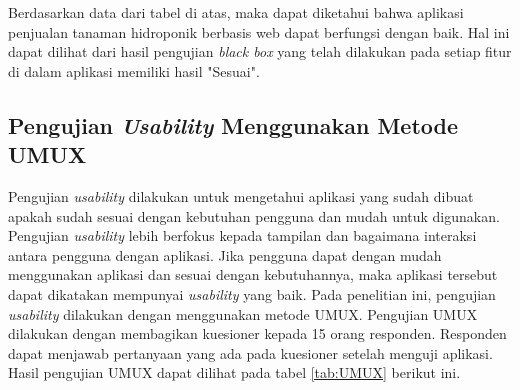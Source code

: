 
\par Berdasarkan data dari tabel di atas, maka dapat diketahui bahwa aplikasi penjualan tanaman hidroponik berbasis web dapat berfungsi dengan baik. Hal ini dapat dilihat dari hasil pengujian \textit{black box} yang telah dilakukan pada setiap fitur di dalam aplikasi memiliki hasil "Sesuai".

\subsection{Pengujian \textit{Usability} Menggunakan Metode UMUX}
Pengujian \textit{usability} dilakukan untuk mengetahui aplikasi yang sudah dibuat apakah sudah sesuai dengan kebutuhan pengguna dan mudah untuk digunakan. Pengujian \textit{usability} lebih berfokus kepada tampilan dan bagaimana interaksi antara pengguna dengan aplikasi. Jika pengguna dapat dengan mudah menggunakan aplikasi dan sesuai dengan kebutuhannya, maka aplikasi tersebut dapat dikatakan mempunyai \textit{usability} yang baik. Pada penelitian ini, pengujian \textit{usability} dilakukan dengan menggunakan metode UMUX. Pengujian UMUX dilakukan dengan membagikan kuesioner kepada 15 orang responden. Responden dapat menjawab pertanyaan yang ada pada kuesioner setelah menguji aplikasi. Hasil pengujian UMUX dapat dilihat pada tabel \ref*{tab:UMUX} berikut ini.


